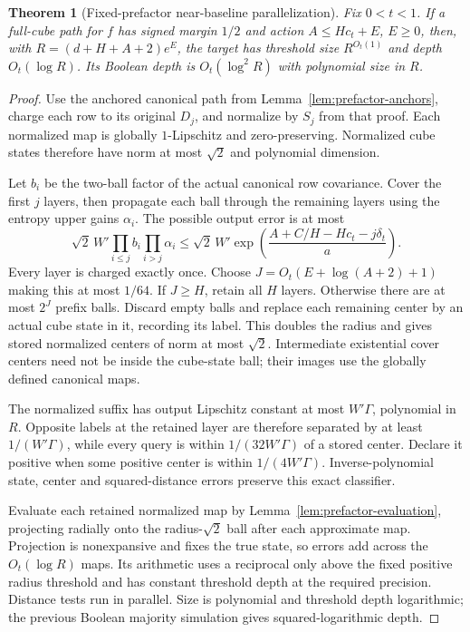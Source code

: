 \documentclass[11pt]{article}
\newtheorem{theorem}{Theorem}[section]
\theoremstyle{remark}
\begin{document}
\begin{theorem}[Fixed-prefactor near-baseline parallelization]
\label{thm:prefactor-normal-form}
Fix $0<t<1$. If a full-cube path for $f$ has signed margin
$1/2$ and action $A\le Hc_t+E$, $E\ge0$, then, with
$R=(d+H+A+2)e^E$, the target has threshold size $R^{O_t(1)}$
and depth $O_t(\log R)$. Its Boolean depth is $O_t(\log^2R)$
with polynomial size in $R$.
\end{theorem}
\begin{proof}
Use the anchored canonical path from
Lemma~\ref{lem:prefactor-anchors}, charge each row to its
original $D_j$, and normalize by $S_j$ from that proof.
Each normalized map is globally $1$-Lipschitz and
zero-preserving. Normalized cube states therefore have norm
at most $\sqrt2$ and polynomial dimension.

Let $b_i$ be the two-ball factor of the actual canonical row
covariance. Cover the first $j$ layers, then propagate each
ball through the remaining layers using the entropy upper
gains $\alpha_i$. The possible output error is at most
\begin{equation}
 \sqrt2\,W'\prod_{i\le j}b_i\prod_{i>j}\alpha_i
 \le\sqrt2\,W'
 \exp\left(\frac{A+C/H-Hc_t-j\delta_t}{a}\right).
 \label{eq:prefactor-prefix-error}
\end{equation}
Every layer is charged exactly once. Choose
$J=O_t(E+\log(A+2)+1)$ making this at most $1/64$.
If $J\ge H$, retain all $H$ layers. Otherwise there are at
most $2^J$ prefix balls. Discard empty balls and replace each
remaining center by an actual cube state in it, recording its
label. This doubles the radius and gives stored normalized
centers of norm at most $\sqrt2$. Intermediate existential
cover centers need not be inside the cube-state ball; their
images use the globally defined canonical maps.

The normalized suffix has output Lipschitz constant at most
$W'\Gamma$, polynomial in $R$. Opposite labels at the retained
layer are therefore separated by at least $1/(W'\Gamma)$,
while every query is within $1/(32W'\Gamma)$ of a stored
center. Declare it positive when some positive center is within
$1/(4W'\Gamma)$. Inverse-polynomial state, center and
squared-distance errors preserve this exact classifier.

Evaluate each retained normalized map by
Lemma~\ref{lem:prefactor-evaluation}, projecting radially onto
the radius-$\sqrt2$ ball after each approximate map.
Projection is nonexpansive and fixes the true state, so errors
add across the $O_t(\log R)$ maps. Its arithmetic uses a
reciprocal only above the fixed positive radius threshold and
has constant threshold depth at the required precision.
Distance tests run in parallel. Size is polynomial and
threshold depth logarithmic; the previous Boolean majority
simulation gives squared-logarithmic depth.
\end{proof}
\end{document}
